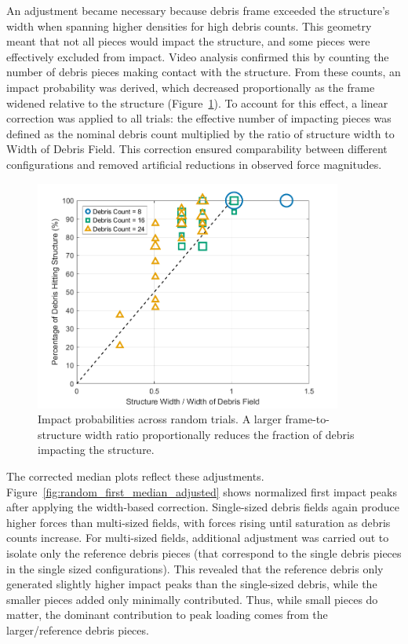 \documentclass{article}
\begin{document}
An adjustment became necessary because debris frame exceeded the structure’s width when spanning higher densities for high debris counts. This geometry meant that not all pieces would impact the structure, and some pieces were effectively excluded from impact. Video analysis confirmed this by counting the number of debris pieces making contact with the structure. From these counts, an impact probability was derived, which decreased proportionally as the frame widened relative to the structure (Figure~\ref{fig:impact_probabilities}). To account for this effect, a linear correction was applied to all trials: the effective number of impacting pieces was defined as the nominal debris count multiplied by the ratio of structure width to Width of Debris Field. This correction ensured comparability between different configurations and removed artificial reductions in observed force magnitudes.

\begin{figure}[htbp]
    \centering
    \includegraphics[width=0.9\textwidth]{Impact_probabilities.png}
    \caption{Impact probabilities across random trials. A larger frame-to-structure width ratio proportionally reduces the fraction of debris impacting the structure.}
    \label{fig:impact_probabilities}
\end{figure}

The corrected median plots reflect these adjustments. Figure~\ref{fig:random_first_median_adjusted} shows normalized first impact peaks after applying the width-based correction. Single-sized debris fields again produce higher forces than multi-sized fields, with forces rising until saturation as debris counts increase. For multi-sized fields, additional adjustment was carried out to isolate only the reference debris pieces (that correspond to the single debris pieces in the single sized configurations). This revealed that the reference  debris only generated slightly higher impact peaks than the single-sized debris, while the smaller pieces added only minimally contributed. Thus, while small pieces do matter, the dominant contribution to peak loading comes from the larger/reference debris pieces.
\end{document}
